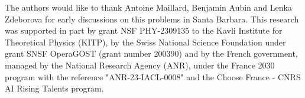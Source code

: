 The authors would like to thank Antoine Maillard, Benjamin Aubin and Lenka Zdeborova for early discussions on this problems in Santa Barbara. This research was supported in part by grant NSF PHY-2309135 to the Kavli Institute for Theoretical Physics (KITP),  by the Swiss National Science Foundation under grant SNSF OperaGOST (grant number 200390) and  by the French government, managed by the National Research Agency (ANR), under the France 2030 program with the reference "ANR-23-IACL-0008" and the Choose France - CNRS AI Rising Talents program.
